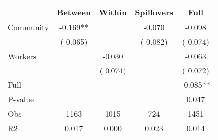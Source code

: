 
\begin{tabular}{l*{4}{c}}\hline&\multicolumn{1}{c}{Between}&\multicolumn{1}{c}{Within}&\multicolumn{1}{c}{Spillovers}&\multicolumn{1}{c}{Full}\\ \hline
 Community             &             -0.169**      &                                               &       -0.070 &        -0.098                            \\ 
                               &        (       0.065)           &                                       &       (       0.082)     &      (       0.074)                                           \\ 
 Workers       &                                               &       -0.030    &                                &            -0.063                            \\ 
                               &                                               & (       0.074)                  &                                        &      (       0.072)                                           \\ 
\hline                                                                                                                                                                                                                                            
 Full                  &                                               &                                               &                                        &            -0.085**                                     \\ 
 P-value               &                                               &                                               &                                        &             0.047                                           \\ 
 Obs                   &               1163               &       1015                       &       724                &              1451                                               \\ 
 R2                    &                      0.017              &              0.000                      &              0.023               &                     0.014                                              \\ 
\hline \end{tabular}                                                                                                                                                                                                              